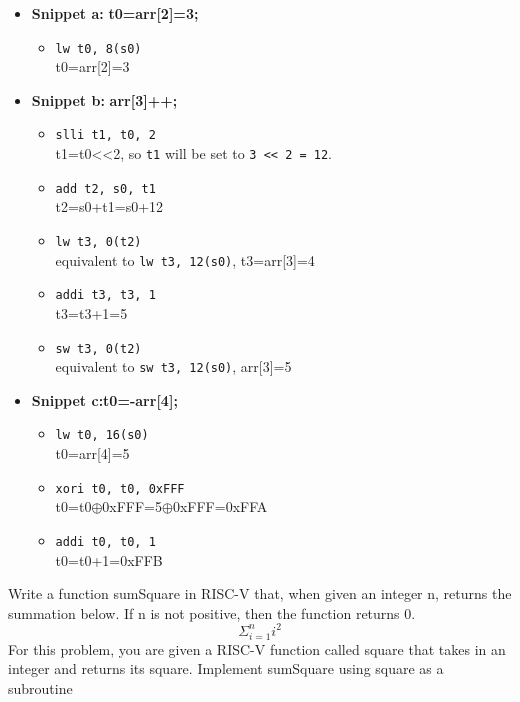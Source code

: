 \documentclass[cn,12pt]{homework}
\begin{document}
\begin{solution}
  \quad

\begin{itemize}
  \item \textbf{Snippet a:} \textbf{t0=arr[2]=3;}
  \begin{itemize}
    \item \texttt{lw t0, 8(s0)} \\
    t0=arr[2]=3
  \end{itemize}

  \item \textbf{Snippet b:} \textbf{arr[3]++;}
  \begin{itemize}
    \item \texttt{slli t1, t0, 2} \\
    t1=t0<<2, so \texttt{t1} will be set to \texttt{3 << 2 = 12}.
    \item \texttt{add t2, s0, t1} \\
    t2=s0+t1=s0+12
    \item \texttt{lw t3, 0(t2)} \\
    equivalent to \texttt{lw t3, 12(s0)}, t3=arr[3]=4
    \item \texttt{addi t3, t3, 1} \\
    t3=t3+1=5
    \item \texttt{sw t3, 0(t2)} \\
    equivalent to \texttt{sw t3, 12(s0)}, arr[3]=5
  \end{itemize}

  \item \textbf{Snippet c:}\textbf{t0=-arr[4];} 
  
  \begin{itemize}
    \item \texttt{lw t0, 16(s0)} \\
    t0=arr[4]=5
    \item \texttt{xori t0, t0, 0xFFF} \\
    t0=t0$\oplus$0xFFF=5$\oplus$0xFFF=0xFFA
    \item \texttt{addi t0, t0, 1} \\
    t0=t0+1=0xFFB
  \end{itemize}
\end{itemize}

\end{solution}


\begin{problem}
  \quad
Write a function sumSquare in RISC-V that, when given an integer n, returns the summation 
below. If n is not positive, then the function returns 0.
\begin{equation}
  \Sigma_{i=1}^{n} i^2
\end{equation}
For this problem, you are given a RISC-V function called square that takes in an integer and 
returns its square. Implement sumSquare using square as a subroutine
\end{problem}
\end{document}

